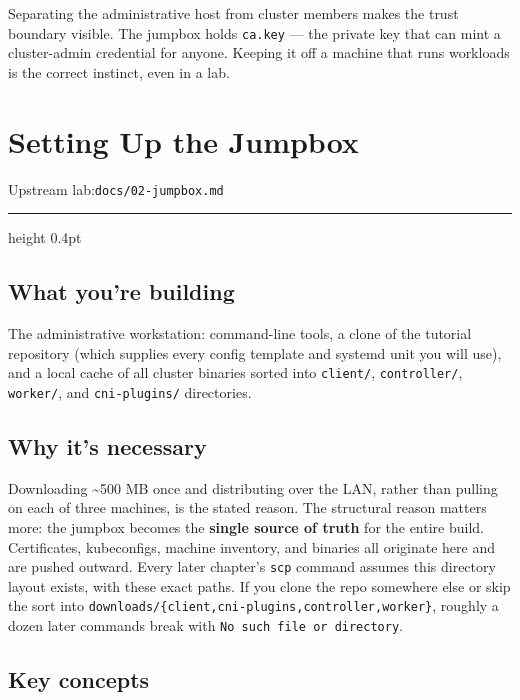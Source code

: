 \documentclass[11pt,oneside]{report}
\newcommand{\upstreamlab}[1]{%
  {\sffamily\footnotesize\color{steel}Upstream lab:\quad\texttt{#1}}\par\vspace{2pt}%
  {\color{rule}\hrule height 0.4pt}\vspace{8pt}}
\begin{document}
Separating the
administrative host
from cluster members
makes the trust
boundary visible.
The jumpbox holds
\texttt{ca.key} ---
the private key that
can mint a
cluster-admin
credential for
anyone. Keeping it
off a machine that
runs workloads is
the correct
instinct, even in a
lab.

\hypertarget{chap-2}{%
\chapter{Setting Up
the
Jumpbox}\label{chap-2}}

\upstreamlab{docs/02-jumpbox.md}

\hypertarget{what-youre-building-2}{%
\section{What you're
building}\label{what-youre-building-2}}

The administrative
workstation:
command-line tools,
a clone of the
tutorial repository
(which supplies
every config
template and systemd
unit you will use),
and a local cache of
all cluster binaries
sorted into
\texttt{client/},
\texttt{controller/},
\texttt{worker/},
and
\texttt{cni-plugins/}
directories.

\hypertarget{why-its-necessary-2}{%
\section{Why it's
necessary}\label{why-its-necessary-2}}

\begin{whybox}

Downloading
\textasciitilde500
MB once and
distributing over
the LAN, rather than
pulling on each of
three machines, is
the stated reason.
The structural
reason matters more:
the jumpbox becomes
the \textbf{single
source of truth} for
the entire build.
Certificates,
kubeconfigs, machine
inventory, and
binaries all
originate here and
are pushed outward.
Every later
chapter's
\texttt{scp} command
assumes this
directory layout
exists, with these
exact paths. If you
clone the repo
somewhere else or
skip the sort into
\texttt{downloads/}\allowbreak{}\texttt{\{client,cni-}\allowbreak{}\texttt{plugins,controller,worker\}},
roughly a dozen
later commands break
with
\texttt{No\ such\ file\ or\ directory}.

\end{whybox}

\hypertarget{key-concepts-2}{%
\section{Key
concepts}\label{key-concepts-2}}
\end{document}
